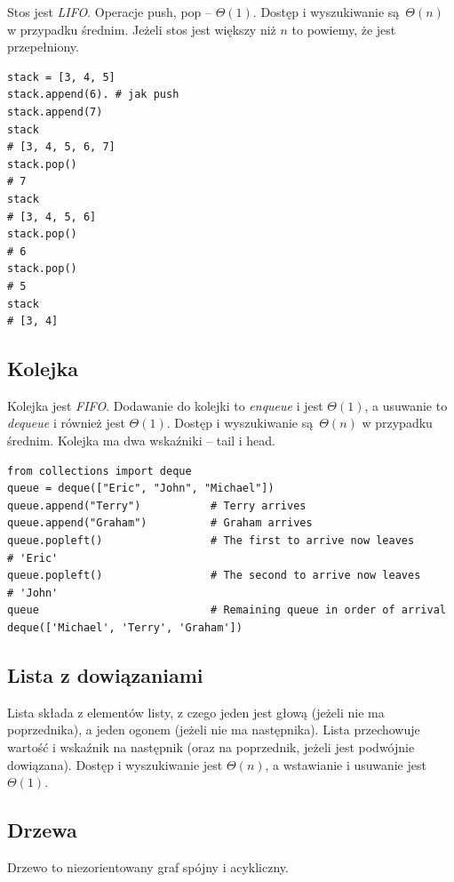 \documentclass[10pt, oneside]{article}
\theoremstyle{remark}
\begin{document}
Stos jest \emph{LIFO}. Operacje push, pop -- $\Theta(1)$. 
Dostęp i wyszukiwanie są $\Theta(n)$ w przypadku średnim.
Jeżeli stos jest większy niż $n$ to powiemy, że jest przepełniony.

\begin{verbatim}
stack = [3, 4, 5]
stack.append(6). # jak push
stack.append(7)
stack
# [3, 4, 5, 6, 7]
stack.pop()
# 7
stack
# [3, 4, 5, 6]
stack.pop()
# 6
stack.pop()
# 5
stack
# [3, 4]
\end{verbatim}


\subsection{Kolejka}
Kolejka jest \emph{FIFO}.
Dodawanie do kolejki to \emph{enqueue} i jest $\Theta(1)$, a usuwanie to \emph{dequeue} i również jest $\Theta(1)$.
Dostęp i wyszukiwanie są $\Theta(n)$ w przypadku średnim.
Kolejka ma dwa wskaźniki -- tail i head.
\begin{verbatim}
from collections import deque
queue = deque(["Eric", "John", "Michael"])
queue.append("Terry")           # Terry arrives
queue.append("Graham")          # Graham arrives
queue.popleft()                 # The first to arrive now leaves
# 'Eric'
queue.popleft()                 # The second to arrive now leaves
# 'John'
queue                           # Remaining queue in order of arrival
deque(['Michael', 'Terry', 'Graham'])
\end{verbatim}

\subsection{Lista z dowiązaniami}
Lista składa z elementów listy, z czego jeden jest głową (jeżeli nie ma poprzednika), a jeden ogonem (jeżeli nie ma następnika).
Lista przechowuje wartość i wskaźnik na następnik (oraz na poprzednik, jeżeli jest podwójnie dowiązana).
Dostęp i wyszukiwanie jest $\Theta(n)$, a wstawianie i usuwanie jest $\Theta(1)$.

\subsection{Drzewa}
Drzewo to niezorientowany graf spójny i acykliczny.
\end{document}
